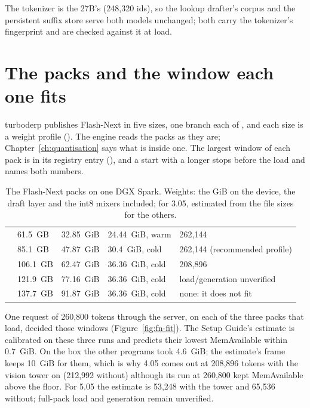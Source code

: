 The tokenizer is the 27B's (248,320 ids), so the lookup drafter's corpus and the persistent suffix store serve both models unchanged; both carry the tokenizer's fingerprint and are checked against it at load.

\section{The packs and the window each one fits}\label{sec:fn-packs}

turboderp publishes Flash-Next in five sizes, one branch each of , and each size is a weight profile (). The engine reads the packs as they are; Chapter~\ref{ch:quantisation} says what is inside one. The largest window of each pack is in its registry entry (), and a start with a longer  stops before the load and names both numbers.

\begin{table}[htbp]
\centering\small
\caption[The Flash-Next packs]{The Flash-Next packs on one DGX Spark. Weights: the GiB on the device, the draft layer and the int8 mixers included; \measured{} for 3.05, estimated from the file sizes for the others.}\label{tab:fn-packs}
\begin{tabularx}{\linewidth}{@{}L{.17\linewidth}L{.1\linewidth}L{.13\linewidth}L{.18\linewidth}Y@{}}
\toprule
{} &  &  &  &  \\
\midrule
{} & 61.5~GB & 32.85~GiB & 24.44~GiB, warm & 262,144 \\
 & 85.1~GB & 47.87~GiB & 30.4~GiB, cold & 262,144 (recommended profile) \\
 & 106.1~GB & 62.47~GiB & 36.36~GiB, cold & 208,896 \\
 & 121.9~GB & 77.16~GiB & 36.36~GiB, cold & load/generation unverified \\
 & 137.7~GB & 91.87~GiB & 36.36~GiB, cold & none: it does not fit \\
\bottomrule
\end{tabularx}
\end{table}

One request of 260,800 tokens through the server, on each of the three packs that load, decided those windows (Figure~\ref{fig:fn-fit}). The Setup Guide's estimate is calibrated on these three runs and predicts their lowest MemAvailable within 0.7~GiB. On the box the other programs took 4.6~GiB; the estimate's frame keeps 10~GiB for them, which is why 4.05 comes out at 208,896 tokens with the vision tower on (212,992 without) although its run at 260,800 kept MemAvailable above the floor. For 5.05 the estimate is 53,248 with the tower and 65,536 without; full-pack load and generation remain unverified.

